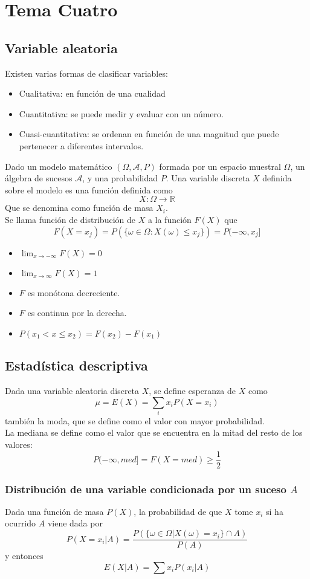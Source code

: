 \documentclass{./Probabilidad.tex}
\begin{document}
\chapter{Tema Cuatro}
\section{Variable aleatoria}
Existen varias formas de clasificar variables:
\begin{itemize}
	\item Cualitativa: en función de una cualidad
	\item Cuantitativa: se puede medir y evaluar con un número.
	\item Cuasi-cuantitativa: se ordenan en función de una magnitud que puede pertenecer a diferentes intervalos.
\end{itemize}
Dado un modelo matemático $(\Omega, \mathcal{A}, P)$ formada por un espacio muestral $\Omega$, un álgebra de sucesos $\mathcal{A}$, y una probabilidad $P$.
Una variable discreta $X$ definida sobre el modelo es una función definida como
$$
X:\Omega\to \mathbb{R}
$$
Que se denomina como función de masa $X_{i}$.\\
Se llama función de distribución de $X$ a la función $F(X)$ que
$$
F(X=x_{j})=P(\{ \omega \in\Omega:X(\omega)\leq x_{j} \})=P(-\infty,x_{j}]
$$
\begin{itemize}
	\item $\lim_{ x \to -\infty }F(X)=0$
	\item $\lim_{ x \to \infty }F(X)=1$
	\item $F$ es monótona decreciente.
	\item $F$ es continua por la derecha.
	\item $P(x_{1}< x\leq x_{2})=F(x_{2})-F(x_{1})$
\end{itemize}
\section{Estadística descriptiva}
Dada una variable aleatoria discreta $X$, se define esperanza de $X$ como
$$
\mu=E(X)=\sum_{i}x_{i}P(X=x_{i})
$$
también la moda, que se define como el valor con mayor probabilidad.\\
La mediana se define como el valor que se encuentra en la mitad del resto de los valores:
$$
P(-\infty, med]=F(X=med) \geq \frac{1}{2}
$$
\subsection{Distribución de una variable condicionada por un suceso $A$}
Dada una función de masa $P(X)$, la probabilidad de que $X$ tome $x_{i}$ si ha ocurrido $A$ viene dada por
$$
P(X=x_{i}|A)=\frac{P(\{ \omega \in \Omega|X(\omega)=x_{i} \}\cap A)}{P(A)}
$$
y entonces
$$
E(X|A)=\sum x_{i}P(x_{i}|A)
$$
\end{document}
